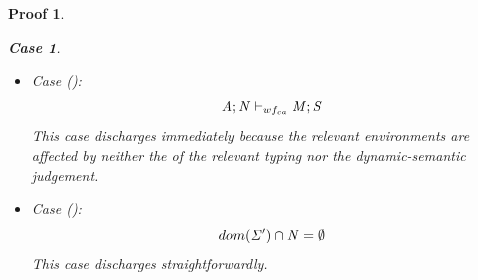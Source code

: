 \documentclass[showabstract,showacknowledgments,showpreface,showdedication]{iuphd}
\newtheorem*{bcase}{Case}
\theoremstyle{nonumberplain}
\newtheorem{nproof}{Proof}
\begin{document}
\begin{nproof}
\begin{bcase}
\begin{itemize}
\begin{itemize}
      \item Case ():
      \begin{align*}
      \mathit{A};\mathit{N} \vdash_{wf_{ca}} \mathit{M};\mathit{S}
      \end{align*}
      This case discharges immediately because the relevant environments
      are affected by neither the of the relevant typing nor the dynamic-semantic judgement.
      \item
      Case ():
      \begin{displaymath}
      dom(\mathit{\Sigma}') \cap \mathit{N} = \emptyset
      \end{displaymath}
      This case discharges straightforwardly.
      \end{itemize}
    \end{itemize}
  \end{bcase}


\end{nproof}
\end{document}
